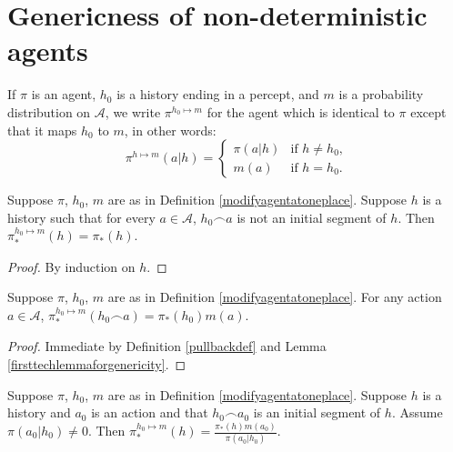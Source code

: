 \documentclass[runningheads]{llncs}
\begin{document}
\section{Genericness of non-deterministic agents}

\begin{definition}
\label{modifyagentatoneplace}
    If $\pi$ is an agent, $h_0$ is a history ending in a percept,
    and $m$ is a probability distribution on $\mathcal A$,
    we write $\pi^{h_0\mapsto m}$ for the agent which is identical to $\pi$
    except that it maps $h_0$ to $m$, in other words:
    \[
        \pi^{h\mapsto m}(a|h)
        =
        \begin{cases}
            \pi(a|h) &\mbox{if $h\not=h_0$,}\\
            m(a) &\mbox{if $h=h_0$.}
        \end{cases}
    \]
\end{definition}

\begin{lemma}
\label{firsttechlemmaforgenericity}
    Suppose $\pi$, $h_0$, $m$ are as in Definition \ref{modifyagentatoneplace}.
    Suppose $h$ is a history such that
    for every $a\in\mathcal A$,
    $h_0\frown a$ is not an initial segment of $h$.
    Then $\pi^{h_0\mapsto m}_*(h)=\pi_*(h)$.
\end{lemma}

\begin{proof}
    By induction on $h$.
\end{proof}

\begin{lemma}
\label{thirdtechlemmaforgenericity}
    Suppose $\pi$, $h_0$, $m$ are as in Definition \ref{modifyagentatoneplace}.
    For any action $a\in\mathcal A$,
    $\pi^{h_0\mapsto m}_*(h_0\frown a)=\pi_*(h_0)m(a)$.
\end{lemma}

\begin{proof}
    Immediate by Definition \ref{pullbackdef} and Lemma \ref{firsttechlemmaforgenericity}.
\end{proof}

\begin{lemma}
\label{secondtechlemmaforgenericity}
    Suppose $\pi$, $h_0$, $m$ are as in Definition \ref{modifyagentatoneplace}.
    Suppose $h$ is a history and $a_0$ is an action and that $h_0\frown a_0$ is
    an initial segment of $h$. Assume $\pi(a_0|h_0)\not=0$. Then
    $\pi^{h_0\mapsto m}_*(h) = \frac{\pi_*(h)m(a_0)}{\pi(a_0|h_0)}$.
\end{lemma}
\end{document}
